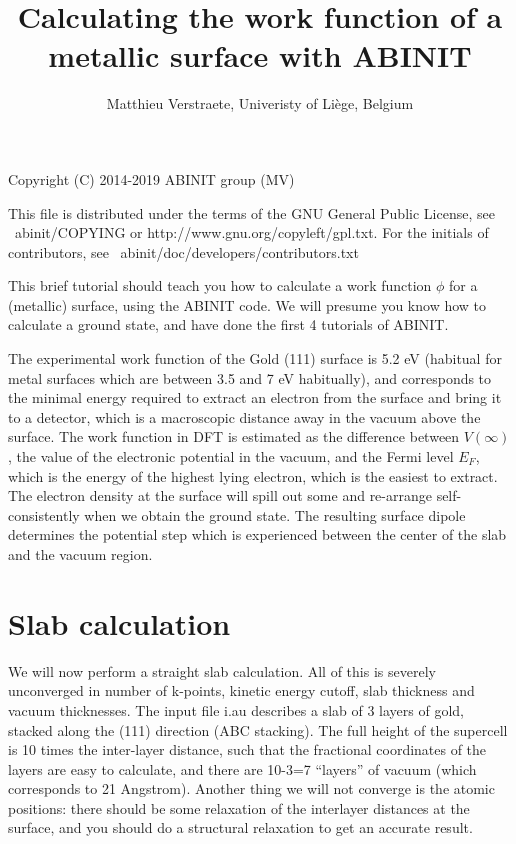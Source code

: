 \documentclass{report}
\begin{document}
\title{Calculating the work function of a metallic surface with ABINIT}

\author{Matthieu Verstraete, Univeristy of Li\`ege, Belgium}

\maketitle
Copyright (C) 2014-2019 ABINIT group (MV)

This file is distributed under the terms of the
GNU General Public License, see ~abinit/COPYING
or http://www.gnu.org/copyleft/gpl.txt.
For the initials of contributors, see ~abinit/doc/developers/contributors.txt

This brief tutorial should teach you how to calculate a work function $\phi$ for a (metallic) surface, using the ABINIT code. We will presume you know how to calculate a ground state, and have done the first 4 tutorials of ABINIT.

The experimental work function of the Gold (111) surface is 5.2 eV (habitual for metal surfaces which are between 3.5 and 7 eV habitually), and corresponds to the minimal energy required to extract an electron from the surface and bring it to a detector, which is a macroscopic distance away in the vacuum above the surface. The work function in DFT is estimated as the difference between $V(\infty)$, the value of the electronic potential in the vacuum, and the Fermi level $E_F$, which is the energy of the highest lying electron, which is the easiest to extract. The electron density at the surface will spill out some and re-arrange self-consistently when we obtain the ground state. The resulting surface dipole determines the potential step which is experienced between the center of the slab and the vacuum region.

\section{Slab calculation}
We will now perform a straight slab calculation. All of this is severely unconverged in number of k-points, kinetic energy cutoff,  slab thickness and vacuum thicknesses. The input file i.au describes a slab of 3 layers of gold, stacked along the (111) direction (ABC stacking). The full height of the supercell is 10 times the inter-layer distance, such that the fractional coordinates of the layers are easy to calculate, and there are 10-3=7 ``layers'' of vacuum (which corresponds to 21 Angstrom). Another thing we will not converge is the atomic positions: there should be some relaxation of the interlayer distances at the surface, and you should do a structural relaxation to get an accurate result.
\end{document}
